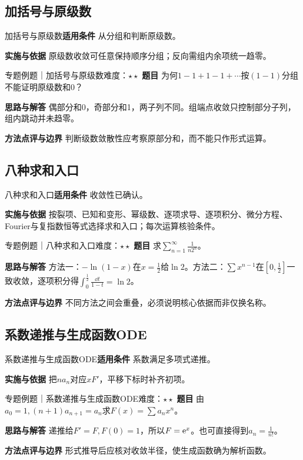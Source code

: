 \subsection{加括号与原级数}\label{mat:series_methods:group}
\begin{method}{加括号与原级数}\textbf{适用条件} 从分组和判断原级数。\par\textbf{实施与依据} 原级数收敛可任意保持顺序分组；反向需组内余项统一趋零。\end{method}
\begin{example}{专题例题｜加括号与原级数}{难度：$\star\star$}
\textbf{题目} 为何$1-1+1-1+\cdots$按$(1-1)$分组不能证明原级数和0？\par\textbf{思路与解答} 偶部分和0，奇部分和1，两子列不同。组端点收敛只控制部分子列，组内跳动并未趋零。\par\textbf{方法点评与边界} 判断级数敛散性应考察原部分和，而不能只作形式运算。
\end{example}
\subsection{八种求和入口}\label{mat:series_methods:eight}
\begin{method}{八种求和入口}\textbf{适用条件} 收敛性已确认。\par\textbf{实施与依据} 按裂项、已知和变形、幂级数、逐项求导、逐项积分、微分方程、Fourier与复指数恒等式选择求和入口；每次运算核验条件。\end{method}
\begin{example}{专题例题｜八种求和入口}{难度：$\star\star$}
\textbf{题目} 求$\sum_{n=1}^\infty\frac{1}{n2^n}$。\par\textbf{思路与解答} 方法一：$-\ln(1-x)$在$x=\frac{1}{2}$给$\ln2$。方法二：$\sum x^{n-1}$在$[0,\frac{1}{2}]$一致收敛，逐项积分得$\int_0^{\frac{1}{2}}\frac{\dd t}{1-t}=\ln2$。\par\textbf{方法点评与边界} 不同方法之间会重叠，必须说明核心依据而非仅换名称。
\end{example}
\subsection{系数递推与生成函数ODE}\label{mat:series_methods:odegen}
\begin{method}{系数递推与生成函数ODE}\textbf{适用条件} 系数满足多项式递推。\par\textbf{实施与依据} 把$n a_n$对应$xF\prime$，平移下标时补齐初项。\end{method}
\begin{example}{专题例题｜系数递推与生成函数ODE}{难度：$\star\star$}
\textbf{题目} 由$a_0=1,(n+1)a_{n+1}=a_n$求$F(x)=\sum a_nx^n$。\par\textbf{思路与解答} 递推给$F\prime=F,F(0)=1$，所以$F=\mathrm{e}^x$。也可直接得到$a_n=\frac{1}{n!}$。\par\textbf{方法点评与边界} 形式推导后应核对收敛半径，使生成函数确为解析函数。
\end{example}
